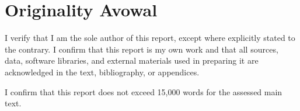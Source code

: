 \section*{Originality Avowal}

I verify that I am the sole author of this report, except where explicitly stated to the contrary. I confirm that this report is my own work and that all sources, data, software libraries, and external materials used in preparing it are acknowledged in the text, bibliography, or appendices.

I confirm that this report does not exceed 15,000 words for the assessed main text.

\clearpage
